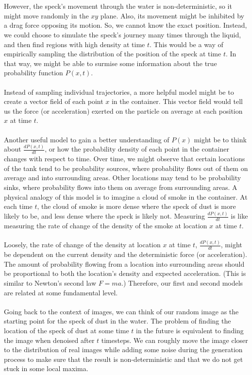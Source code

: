 \documentclass{article}
\begin{document}
\\
\\
However, the speck's movement through the water is non-deterministic, so it might move randomly in the $xy$ plane. Also, its movement might be inhibited by a drag force opposing its motion. So, we cannot know the exact position. Instead, we could choose to simulate the speck's journey many times through the liquid, and then find regions with high density at time $t$. This would be a way of empirically sampling the distribution of the position of the speck at time $t$. In that way, we might be able to surmise some information about the true probability function $P(x,t)$. 
\\
\\
Instead of sampling individual trajectories, a more helpful model might be to create a vector field of each point $x$ in the container. This vector field would tell us the force (or acceleration) exerted on the particle on average at each position $x$ at time $t$. 
\\
\\
Another useful model to gain a better understanding of $P(x)$ might be to think about $\frac{dP(x,t)}{dt}$, or how the probability density of each point in the container changes with respect to time. Over time, we might observe that certain locations of the tank tend to be probability sources, where probability flows out of them on average and into surrounding areas. Other locations may tend to be probability sinks, where probability flows into them on average from surrounding areas. A physical analogy of this model is to imagine a cloud of smoke in the container. At each time $t$, the cloud of smoke is more dense where the speck of dust is more likely to be, and less dense where the speck is likely not. Measuring $\frac{dP(x,t)}{dt}$ is like measuring the rate of change of the density of the smoke at location $x$ at time $t$. 
\\
\\
Loosely, the rate of change of the density at location $x$ at time $t$, $\frac{dP(x,t)}{dt}$, might be dependent on the current density and the deterministic force (or acceleration). The amount of probability flowing from a location into surrounding areas should be proportional to both the location's density and expected acceleration. (This is similar to Newton's second law $F=ma$.) Therefore, our first and second models are related at some fundamental level. 
\\
\\
Going back to the context of images, we can think of our random image as the starting point for the speck of dust in the water. The problem of finding the location of the speck of dust at some time $t$ in the future is equivalent to finding the image when denoised after $t$ timesteps. We can roughly move the image closer to the distribution of real images while adding some noise during the generation process to make sure that the result is non-deterministic and that we do not get stuck in some local maxima. 
\end{document}
